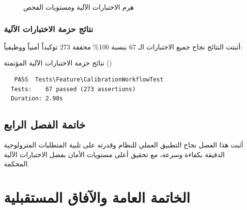 \documentclass{bts-report-ar}
\begin{document}
\begin{figure}[H]
  \centering
  \begin{LTR}
  
  \end{LTR}
  \caption{هرم الاختبارات الآلية ومستويات الفحص}
  \label{fig:testing-pyramid}
\end{figure}

\subsection{نتائج حزمة الاختبارات الآلية}
أثبتت النتائج نجاح جميع الاختبارات الـ 67 بنسبة 100\% محققة 273 توكيداً أمنياً ووظيفياً:

\begin{teststablear}{نتائج حزمة الاختبارات الآلية المؤتمتة ()}
\end{teststablear}

\begin{LTR}
\begin{verbatim}
   PASS  Tests\Feature\CalibrationWorkflowTest
  Tests:    67 passed (273 assertions)
  Duration: 2.98s
\end{verbatim}
\end{LTR}

\section*{خاتمة الفصل الرابع}
أثبت هذا الفصل نجاح التطبيق العملي للنظام وقدرته على تلبية المتطلبات المترولوجية الدقيقة بكفاءة وسرعة، مع تحقيق أعلى مستويات الأمان بفضل الاختبارات الآلية المحكمة.


\chapter*{الخاتمة العامة والآفاق المستقبلية}
\end{document}
